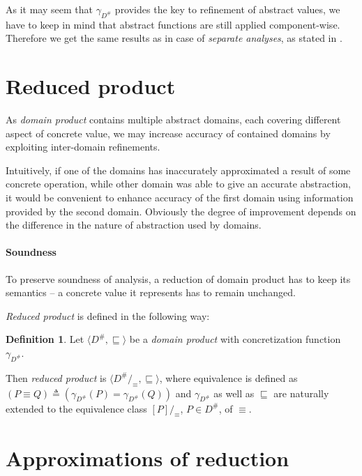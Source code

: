 \documentclass[12pt,oneside]{fithesis2}
\theoremstyle{definition}
\newtheorem{definition}{Definition}
\begin{document}
As it may seem that $\gamma_{D^\#}$ provides the key to refinement of abstract values, we have to keep in mind that abstract functions are still applied component-wise. Therefore we get the same results as in case of \textit{separate analyses}, as stated in \cite{CousotCousot79-1}.

\section{Reduced product}\label{sec:reduced-cardinality-product}

As \textit{domain product} contains multiple abstract domains, each covering different aspect of concrete value, we may increase accuracy of contained domains by exploiting inter-domain refinements.

Intuitively, if one of the domains has inaccurately approximated a result of some concrete operation, while other domain was able to give an accurate abstraction, it would be convenient to enhance accuracy of the first domain using information provided by the second domain. Obviously the degree of improvement depends on the difference in the nature of abstraction used by domains.

\paragraph{Soundness} To preserve soundness of analysis, a reduction of domain product has to keep its semantics -- a concrete value it represents has to remain unchanged.

\textit{Reduced product} is defined in the following way: \cite{CousotCousotMauborgne-FoSSaCS-11}

\begin{definition}
  Let $\langle D^\#, \sqsubseteq \rangle$ be a \textit{domain product} with concretization function $\gamma_{D^\#}$.

  Then \textit{reduced product} is $\langle D^\# /_\equiv, \sqsubseteq \rangle$, where equivalence is defined as  $\left(P \equiv Q \right) \triangleq \left(\gamma_{D^\#}(P) = \gamma_{D^\#}(Q) \right)$ and $\gamma_{D^\#}$ as well as $\sqsubseteq$ are naturally extended to the equivalence class $[P]/_\equiv$, $P \in D^\#$, of $\equiv$.
\end{definition}

\section{Approximations of reduction}\label{sec:reductions}
\end{document}
